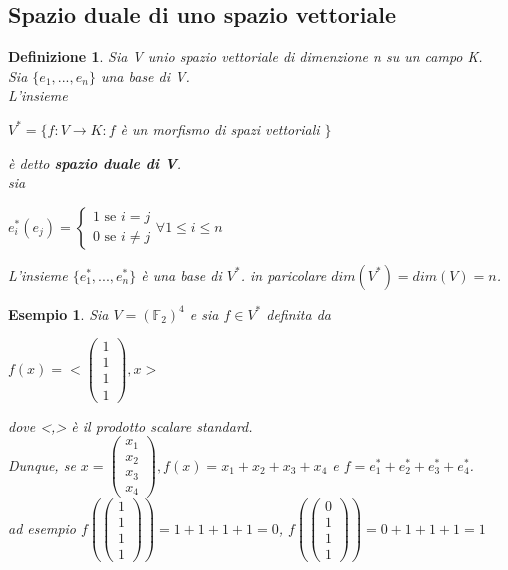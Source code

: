 \documentclass[a4paper,12pt]{article}
\theoremstyle{def}
\newtheorem*{definition}{Definizione}
\theoremstyle{prop}
\theoremstyle{esempio}
\newtheorem*{example}{Esempio}
\theoremstyle{dimostrazione}
\theoremstyle{teo}
\theoremstyle{osservazione}
\begin{document}
\newpage
\subsection{Spazio duale di uno spazio vettoriale}
\begin{definition}
	Sia V unio spazio vettoriale di dimenzione n su un campo K.\\
	Sia \(\{e_1, ..., e_n\}\) una base di V.\\
	L'insieme 
	\begin{center}
		\(V^* = \{f : V \rightarrow K : f\) è un morfismo di spazi vettoriali \(\}\)\\
	\end{center}
	è detto \textbf{spazio duale di V}.\\
	sia 
	\begin{center}
		\(e^*_i(e_j)= \begin{cases}
			1 \text{ se } i = j \\
			0 \text{ se } i \neq j
		\end{cases} \forall 1 \leq i \leq n\)
	\end{center}
	L'insieme \(\{e^*_1, ..., e^*_n\}\) è una base di \(V^*\). in paricolare \(dim(V^*) = dim(V) = n\).\\
\end{definition}

\begin{example}
	Sia \(V = (\mathbb{F}_2)^4\) e sia \(f \in V^*\) definita da
	\begin{center}
		\(f(x) = <\begin{pmatrix}
			1 \\
			1 \\
			1 \\
			1
		\end{pmatrix}, x >\) 
	\end{center}
	dove <,> è il prodotto scalare standard.\\
	Dunque, se \(x = \begin{pmatrix}
		x_1 \\
		x_2 \\
		x_3 \\
		x_4
	\end{pmatrix}, f(x) = x_1 + x_2 + x_3 + x_4\) e \(f = e^*_1 + e^*_2 + e^*_3 + e^*_4\).\\
	ad esempio \(f(\begin{pmatrix}
		1 \\
		1 \\
		1 \\
		1
	\end{pmatrix}) = 1 + 1 + 1 + 1 = 0\),
	\(f(\begin{pmatrix}
		0 \\
		1 \\
		1 \\
		1
	\end{pmatrix}) = 0 + 1 + 1 + 1 = 1 \)
\end{example}
\end{document}
